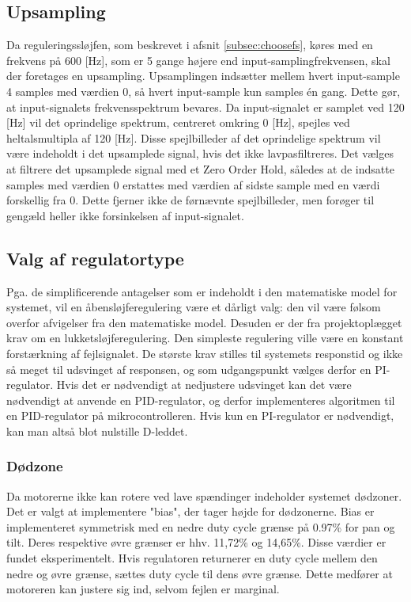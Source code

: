 \subsection{Upsampling}
\label{subsec:upsampling}
Da reguleringssløjfen, som beskrevet i afsnit \ref{subsec:choosefs}, køres med en frekvens på 600 [Hz],
som er 5 gange højere end input-samplingfrekvensen, skal der foretages en upsampling.
Upsamplingen indsætter mellem hvert input-sample 4 samples med værdien 0, så hvert input-sample
kun samples én gang. Dette gør, at input-signalets frekvensspektrum bevares.
Da input-signalet er samplet ved 120 [Hz] vil det oprindelige spektrum, centreret omkring 0 [Hz],
spejles ved heltalsmultipla af 120 [Hz]. Disse spejlbilleder af det oprindelige spektrum vil være
indeholdt i det upsamplede signal, hvis det ikke lavpasfiltreres. 
Det vælges at filtrere det upsamplede signal med et Zero Order Hold,
således at de indsatte samples med værdien 0 erstattes med værdien af sidste sample
med en værdi forskellig fra 0. Dette fjerner ikke de førnævnte spejlbilleder, men forøger
til gengæld heller ikke forsinkelsen af input-signalet.

\subsection{Valg af regulatortype}
\label{ss:ValgReg}
Pga. de simplificerende antagelser som er indeholdt i den matematiske model for systemet,
vil en åbensløjferegulering være et dårligt valg: den vil være følsom overfor afvigelser fra den
matematiske model. Desuden er der fra projektoplægget krav om en lukketsløjferegulering.
Den simpleste regulering ville være en konstant forstærkning af fejlsignalet.
De største krav stilles til systemets responstid og ikke så meget til udsvinget af responsen,
og som udgangspunkt vælges derfor en PI-regulator.
Hvis det er nødvendigt at nedjustere udsvinget kan det være nødvendigt at anvende en PID-regulator,
og derfor implementeres algoritmen til en PID-regulator på mikrocontrolleren.
Hvis kun en PI-regulator er nødvendigt, kan man altså blot nulstille D-leddet.

\subsubsection{Dødzone}
Da motorerne ikke kan rotere ved lave spændinger indeholder systemet dødzoner.
Det er valgt at implementere "bias", der tager højde for dødzonerne.
Bias er implementeret symmetrisk med en nedre duty cycle grænse på 0.97\% for pan og tilt.
Deres respektive øvre grænser er hhv. 11,72\% og 14,65\%.
Disse værdier er fundet eksperimentelt.
Hvis regulatoren returnerer en duty cycle mellem den nedre og øvre grænse, sættes duty cycle til dens øvre grænse.
Dette medfører at motoreren kan justere sig ind, selvom fejlen er marginal.

